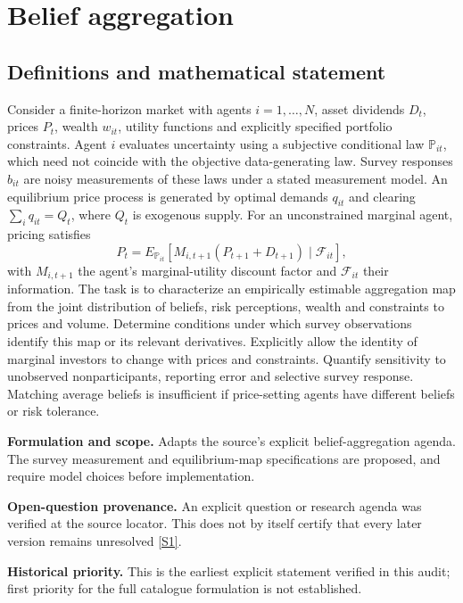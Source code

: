 \documentclass[11pt]{article}
\newcommand{\sref}[2]{\hyperlink{source:#1:#2}{[S#2]}}
\begin{document}
\section*{Belief aggregation}\label{30007595}
\subsection{Definitions and mathematical statement}
Consider a finite-horizon market with agents \(i=1,\ldots,N\), asset dividends \(D_t\), prices \(P_t\), wealth \(w_{it}\), utility functions and explicitly specified portfolio constraints. Agent \(i\) evaluates uncertainty using a subjective conditional law \(\mathbb P_{it}\), which need not coincide with the objective data-generating law. Survey responses \(b_{it}\) are noisy measurements of these laws under a stated measurement model. An equilibrium price process is generated by optimal demands \(q_{it}\) and clearing \(\sum_iq_{it}=Q_t\), where \(Q_t\) is exogenous supply. For an unconstrained marginal agent, pricing satisfies
\[P_t=E_{\mathbb P_{it}}[M_{i,t+1}(P_{t+1}+D_{t+1})\mid\mathcal F_{it}],\]
with \(M_{i,t+1}\) the agent's marginal-utility discount factor and \(\mathcal F_{it}\) their information. The task is to characterize an empirically estimable aggregation map from the joint distribution of beliefs, risk perceptions, wealth and constraints to prices and volume. Determine conditions under which survey observations identify this map or its relevant derivatives. Explicitly allow the identity of marginal investors to change with prices and constraints. Quantify sensitivity to unobserved nonparticipants, reporting error and selective survey response. Matching average beliefs is insufficient if price-setting agents have different beliefs or risk tolerance.

\par\textbf{Formulation and scope.} Adapts the source’s explicit belief-aggregation agenda. The survey measurement and equilibrium-map specifications are proposed, and require model choices before implementation.

\par\textbf{Open-question provenance.} An explicit question or research agenda was verified at the source locator. This does not by itself certify that every later version remains unresolved \sref{30007595}{1}.

\par\textbf{Historical priority.} This is the earliest explicit statement verified in this audit; first priority for the full catalogue formulation is not established.
\end{document}
